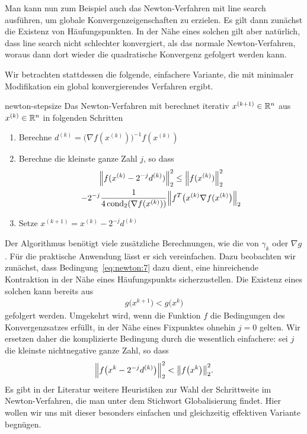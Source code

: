 \begin{remark}
  Man kann nun zum Beispiel auch das Newton-Verfahren mit line search
  ausführen, um globale Konvergenzeigenschaften zu erzielen. Es gilt
  dann zunächst die Existenz von Häufungspunkten. In der Nähe eines
  solchen gilt aber natürlich, dass line search nicht schlechter
  konvergiert, als das normale Newton-Verfahren, woraus dann dort
  wieder die quadratische Konvergenz gefolgert werden kann.

  Wir betrachten stattdessen die folgende, einfachere Variante, die
  mit minimaler Modifikation ein global konvergierendes Verfahren
  ergibt.
\end{remark}

\begin{Definition}{newton-stepsize}
  Das Newton-Verfahren mit  berechnet iterativ
  $x^{(k+1)}\in \mathbb R^n$ aus $x^{(k)}\in \mathbb R^n$ in folgenden Schritten
  \begin{enumerate}
  \item Berechne $d^{(k)} = \bigl(\nabla f(x^{(k)})\bigr)^{-1}f(x^{(k)})$
  \item Berechne die kleinste ganze Zahl $j$, so dass
    \begin{multline}
      \norm*{f(x^{(k)}-2^{-j} d^{(k)})}_2^2
      \le \norm*{f(x^{(k)})}_2^2
      \\- 2^{-j} \frac{1}{4\cond_2(\nabla f(x^{(k)}))}
      \norm*{f^T\bigl(x^{(k)}\nabla f(x^{(k)}\bigr)}_2
    \end{multline}
    \item Setze $x^{(k+1)}=x^{(k)}-2^{-j} d^{(k)}$
  \end{enumerate}
\end{Definition}

\begin{remark}
  Der Algorithmus benötigt viele zusätzliche Berechnungen, wie die von
  $\gamma_k$ oder $\nabla g$. Für die praktische Anwendung lässt er
  sich vereinfachen. Dazu beobachten wir zunächst, dass
  Bedingung~\eqref{eq:newton:7} dazu dient, eine hinreichende
  Kontraktion in der Nähe eines Häufungspunkts sicherzustellen. Die
  Existenz eines solchen kann bereits aus
  \begin{gather}
    g\bigl(x^{k+1}\bigr) < g\bigl(x^{k}\bigr)
  \end{gather}
  gefolgert werden. Umgekehrt wird, wenn die Funktion $f$ die
  Bedingungen des Konvergenzsatzes 
  erfüllt, in der Nähe eines Fixpunktes ohnehin $j=0$ gelten. Wir
  ersetzen daher die komplizierte Bedingung durch die wesentlich
  einfachere: sei $j$ die kleinste nichtnegative ganze Zahl, so dass
  \begin{gather}
    \norm*{f\bigl(x^{k} - 2^{-j} d^{(k)}\bigr)}_2^2 < \norm*{f\bigl(x^{k}\bigr)}_2^2.
  \end{gather}
  Es gibt in der Literatur weitere Heuristiken zur Wahl der
  Schrittweite im Newton-Verfahren, die man unter dem Stichwort \glqq
  Globalisierung\grqq{} findet. Hier wollen wir uns mit dieser
  besonders einfachen und gleichzeitig effektiven Variante begnügen.
\end{remark}

